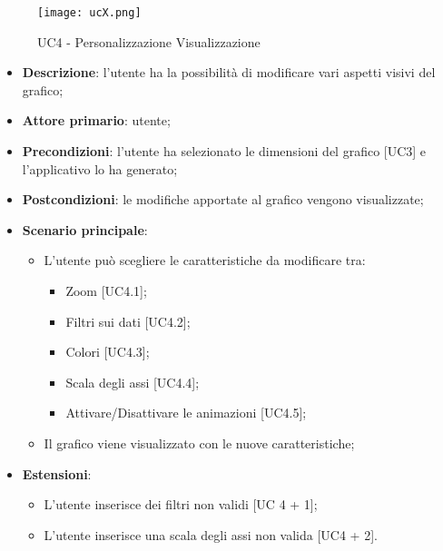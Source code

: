 \begin{figure}[h]
  \centering
  \texttt{[image: ucX.png]}
  \caption{UC4 - Personalizzazione Visualizzazione}
\end{figure}

\begin{itemize}
  \item \textbf{Descrizione}: l'utente ha la possibilità di modificare vari aspetti visivi del grafico;
  \item \textbf{Attore primario}: utente;
  \item \textbf{Precondizioni}: l'utente ha selezionato le dimensioni del grafico [UC3] e l'applicativo lo ha generato;
  \item \textbf{Postcondizioni}: le modifiche apportate al grafico vengono visualizzate;
  \item \textbf{Scenario principale}: 
  \begin{itemize}
    \item L'utente può scegliere le caratteristiche da modificare tra: 
      \begin{itemize}
        \item Zoom [UC4.1];
        \item Filtri sui dati [UC4.2];
        \item Colori [UC4.3];
        \item Scala degli assi [UC4.4];
        \item Attivare/Disattivare le animazioni [UC4.5];
      \end{itemize}
    \item Il grafico viene visualizzato con le nuove caratteristiche;
  \end{itemize}
  \item \textbf{Estensioni}: 
    \begin{itemize}
      \item L'utente inserisce dei filtri non validi [UC 4 + 1];
      \item L'utente inserisce una scala degli assi non valida [UC4 + 2].
    \end{itemize}
\end{itemize}

